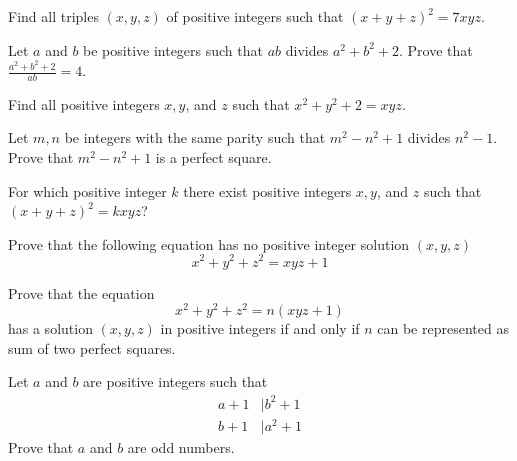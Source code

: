 \begin{problem} %
	Find all triples $(x,y,z)$ of positive integers such that $(x+y+z)^2=7xyz$.
\end{problem}

\begin{problem} %
 Let $a$ and $b$ be positive integers such that $ab$ divides $a^2 + b^2 + 2$. Prove that $\frac{a^2 + b^2 + 2}{ab} = 4$.
\end{problem}

\begin{problem} %
	Find all positive integers $x,y$, and $z$ such that $x^2+y^2+2=xyz$.
\end{problem}

\begin{problem}[Ireland 2005] %
	Let $m,n$ be integers with the same parity such that $m^2-n^2+1$ divides $n^2-1$. Prove that $m^2-n^2+1$ is a perfect square.
\end{problem}

\begin{problem}[Mongolia 2000] %
	For which positive integer $k$ there exist positive integers $x,y$, and $z$ such that $(x+y+z)^2= kxyz$?
\end{problem}

\begin{problem} %
	Prove that the following equation has no positive integer solution $(x,y,z)$ \[x^2+y^2+z^2=xyz+1\]
\end{problem}

\begin{problem} %
	Prove that the equation \[x^2+y^2+z^2=n(xyz+1)\] has a solution $(x,y,z)$ in positive integers if and only if $n$ can be represented as sum of two perfect squares.
\end{problem}

\begin{problem} %
	Let $a$ and $b$ are positive integers such that
		\begin{align*}
			a + 1
				& \mid {b^2} + 1\\
			b + 1
				& \mid{a^2} + 1
		\end{align*}
	Prove that $a$ and $b$ are odd numbers.
\end{problem}

